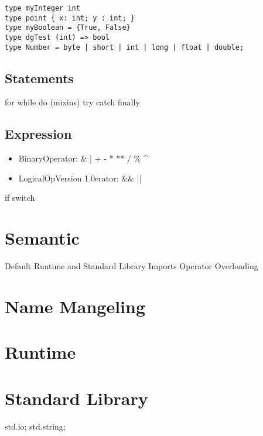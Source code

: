 \documentclass[a4paper]{article}
\begin{document}
\begin{lstlisting}
type myInteger int
type point { x: int; y : int; }
type myBoolean = {True, False}
type dgTest (int) => bool
type Number = byte | short | int | long | float | double;
\end{lstlisting}


\subsection{Statements}
for while do (mixins) try catch finally

\subsection{Expression}
\begin{itemize}
\item BinaryOperator: \& | + - * ** / \% \textasciicircum{} 
\item LogicalOpVersion 1.0erator: \&\&  ||
\end{itemize}
if 
switch

\section{Semantic}
Default Runtime and Standard Library Imports
Operator Overloading

\section{Name Mangeling}

\section{Runtime}

\section{Standard Library}
std.io;
std.string;
\end{document}
